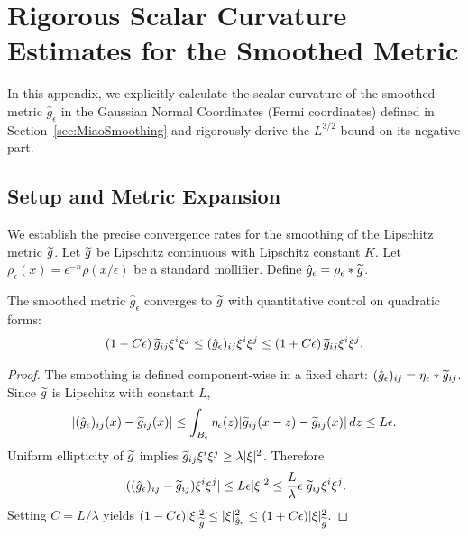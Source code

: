 \section{Rigorous Scalar Curvature Estimates for the Smoothed Metric}
\label{app:SmoothingDetails}

In this appendix, we explicitly calculate the scalar curvature of the smoothed metric $\hat{g}_\epsilon$ in the Gaussian Normal Coordinates (Fermi coordinates) defined in Section~\ref{sec:MiaoSmoothing} and rigorously derive the $L^{3/2}$ bound on its negative part.

\subsection{Setup and Metric Expansion}
We establish the precise convergence rates for the smoothing of the Lipschitz metric $\widetilde{g}$.
Let $\widetilde{g}$ be Lipschitz continuous with Lipschitz constant $K$. Let $\rho_\epsilon(x) = \epsilon^{-n} \rho(x/\epsilon)$ be a standard mollifier.
Define $\hat{g}_\epsilon = \rho_\epsilon * \widetilde{g}$.

\begin{lemma}
The smoothed metric $\hat{g}_\epsilon$ converges to $\widetilde{g}$ with quantitative control on quadratic forms:
\begin{equation}
    (1 - C\epsilon) \, \widetilde{g}_{ij} \xi^i \xi^j \le (\hat{g}_\epsilon)_{ij} \xi^i \xi^j \le (1 + C\epsilon) \, \widetilde{g}_{ij} \xi^i \xi^j.
\end{equation}
\end{lemma}
\begin{proof}
The smoothing is defined component-wise in a fixed chart: $(\hat{g}_\epsilon)_{ij} = \eta_\epsilon * \widetilde{g}_{ij}$. Since $\widetilde{g}$ is Lipschitz with constant $L$,
\[
    |(\hat{g}_\epsilon)_{ij}(x) - \widetilde{g}_{ij}(x)| \le \int_{B_\epsilon} \eta_\epsilon(z) |\widetilde{g}_{ij}(x-z) - \widetilde{g}_{ij}(x)| \, dz \le L\epsilon.
\]
Uniform ellipticity of $\widetilde{g}$ implies $\widetilde{g}_{ij} \xi^i \xi^j \ge \lambda |\xi|^2$. Therefore
\[
    |((\hat{g}_\epsilon)_{ij} - \widetilde{g}_{ij}) \xi^i \xi^j| \le L\epsilon |\xi|^2 \le \frac{L}{\lambda} \epsilon \; \widetilde{g}_{ij} \xi^i \xi^j.
\]
Setting $C = L/\lambda$ yields $(1-C\epsilon)|\xi|_{\widetilde{g}}^2 \le |\xi|_{\hat{g}_\epsilon}^2 \le (1+C\epsilon)|\xi|_{\widetilde{g}}^2$.
\end{proof}

